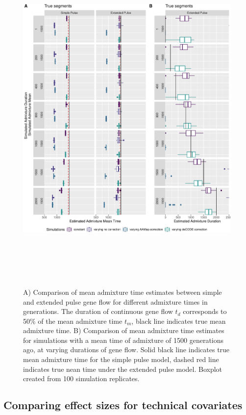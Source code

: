 \documentclass[11pt]{article}
\begin{document}
\begin{figure}
\centering
\includegraphics[width=16cm,height=18cm,keepaspectratio]{ATE_Revisions_files/figure-latex/figR2_1_cutoff-1.pdf}
\caption{\label{fig:fig2} A) Comparison of mean admixture time estimates
between simple and extended pulse gene flow for different admixture times in generations.
The duration of continuous gene flow $t_d$ corresponds to 50\% of the mean
admixture time $t_m$, black line indicates true mean admixture time. B)
Comparison of mean admixture time estimates for simulations with a mean
time of admixture of 1500 generations ago, at varying durations of gene
flow. Solid black line indicates true mean admixture time for the simple pulse model, dashed red line indicates true nean time under the extended pulse model. Boxplot created from 100 simulation replicates.}
\end{figure}


\subsection{Comparing effect sizes for technical covariates}\label{comparing effect sizes}
\end{document}

